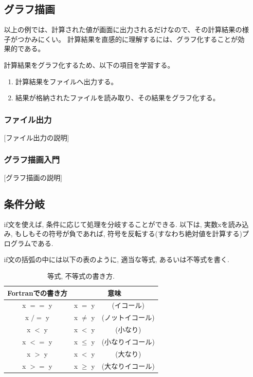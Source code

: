 \documentclass[a4j]{jsarticle}
\begin{document}
%

\subsection{グラフ描画}
以上の例では、計算された値が画面に出力されるだけなので、その計算結果の様子がつかみにくい。
計算結果を直感的に理解するには、グラフ化することが効果的である。

計算結果をグラフ化するため、以下の項目を学習する。
\begin{enumerate}
	\item 計算結果をファイルへ出力する。
	\item 結果が格納されたファイルを読み取り、その結果をグラフ化する。
\end{enumerate}

\subsubsection*{ファイル出力}
[ファイル出力の説明]

\subsubsection*{グラフ描画入門}
[グラフ描画の説明]



\subsection{条件分岐}
if文を使えば, 条件に応じて処理を分岐することができる. 
以下は, 実数xを読み込み, もしもその符号が負であれば, 
符号を反転する(すなわち絶対値を計算する)プログラムである. 

if文の括弧の中には以下の表のように, 適当な等式, あるいは不等式を書く. 

\begin{table}[h]
  \caption{等式, 不等式の書き方. }
  \begin{center}
    \begin{tabular}{ccc}
      \hline
      Fortranでの書き方   & \multicolumn{2}{c}{意味} \\ \hline
      x $==$ y   & x $=$ y &(イコール)\\
      x $/=$ y   & x $\ne$ y &(ノットイコール)\\
      x $<$ y   & x $<$ y &(小なり)\\
      x $<=$ y  & x $\le$ y &(小なりイコール)\\
      x $>$ y  & x $<$ y &(大なり)\\
      x $>=$ y   & x $\ge$ y &(大なりイコール)\\ \hline
    \end{tabular}
  \end{center}
\end{table}
\end{document}
